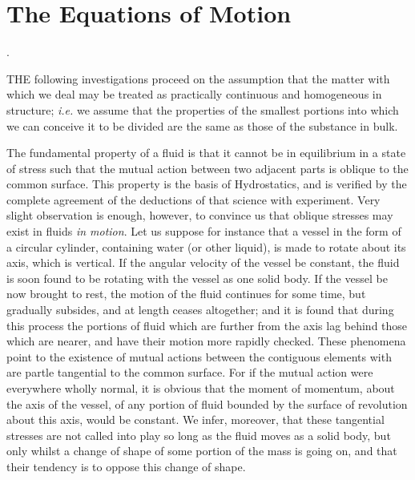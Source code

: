 \documentclass[twoside, openany]{book}
\newcounter{article}
\newcommand{\article}[1]{
  \stepcounter{article}
  \textbf{\thearticle}.
  \markright{#1} %
}
\numberwithin{equation}{article} %
\begin{document}
\tableofcontents

\clearpage{\pagestyle{empty}\cleardoublepage}

\mainmatter

\chapter{The Equations of Motion}


\article{a1}
\MakeUppercase{T{\footnotesize he}} following investigations proceed on the assumption that the matter with which we deal may be treated as practically continuous and homogeneous in structure; \emph{i.e.} we assume that the properties of the smallest portions into which we can conceive it to be divided are the same as those of the substance in bulk.

The fundamental property of a fluid is that it cannot be in equilibrium in a state of stress such that the mutual action between two adjacent parts is oblique to the common surface. This property is the basis of Hydrostatics, and is verified by the complete agreement of the deductions of that science with experiment. Very slight observation is enough, however, to convince us that oblique stresses may exist in fluids \emph{in motion}. Let us suppose for instance that a vessel in the form of a circular cylinder, containing water (or other liquid), is made to rotate about its axis, which is vertical. If the angular velocity of the vessel be constant, the fluid is soon found to be rotating with the vessel as one solid body. If the vessel be now brought to rest, the motion of the fluid continues for some time, but gradually subsides, and at length ceases altogether; and it is found that during this process the portions of fluid which are further from the axis lag behind those which are nearer, and have their motion more rapidly checked. These phenomena point to the existence of mutual actions between the contiguous elements with are partle tangential to the common surface. For if the mutual action were everywhere wholly normal, it is obvious that the moment of momentum, about the axis of the vessel, of any portion of fluid bounded by the surface of revolution about this axis, would be constant. We infer, moreover, that these tangential stresses are not called into play so long as the fluid moves as a solid body, but only whilst a change of shape of some portion of the mass is going on, and that their tendency is to oppose this change of shape.
\end{document}
